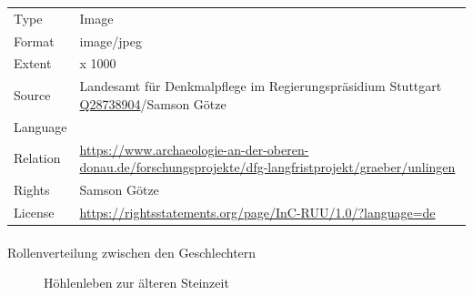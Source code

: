 \documentclass[
  letterpaper,
  DIV=11,
  numbers=noendperiod]{scrartcl}
\makeatletter
\let\oldparagraph\paragraph
\renewcommand{\paragraph}{
    \@ifstar
      \xxxParagraphStar
      \xxxParagraphNoStar
  }
\newcommand{\xxxParagraphStar}[1]{\oldparagraph*{#1}\mbox{}}
\newcommand{\xxxParagraphNoStar}[1]{\oldparagraph{#1}\mbox{}}
\makeatother
\begin{document}
\begin{longtable}[]{@{}
  >{\raggedright\arraybackslash}p{}
  >{\raggedright\arraybackslash}p{}@{}}
Type & Image \\
Format & image/jpeg \\
Extent & 703 x 1000 \\
Source & Landesamt für Denkmalpflege im Regierungspräsidium Stuttgart
\href{https://www.wikidata.org/wiki/Q28738904}{Q28738904}/Samson
Götze \\
Language & \\
Relation &
\url{https://www.archaeologie-an-der-oberen-donau.de/forschungsprojekte/dfg-langfristprojekt/graeber/unlingen} \\
Rights & Samson Götze \\
License &
\url{https://rightsstatements.org/page/InC-RUU/1.0/?language=de} \\
\end{longtable}

\paragraph{Rollenverteilung zwischen den
Geschlechtern}\label{rollenverteilung-zwischen-den-geschlechtern}

\begin{figure}


\caption{\label{fig-hoehlenleben-zur-aelteren-steinzeit}Höhlenleben zur
älteren Steinzeit}

\end{figure}%
\end{document}
